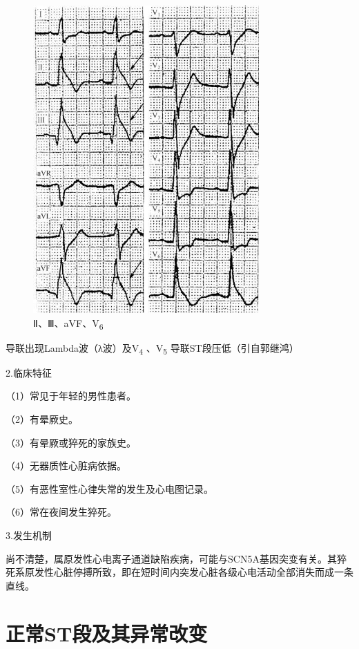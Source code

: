 \begin{figure}[!htbp]
 \centering
 \includegraphics[width=3.40625in,height=4.63542in]{./images/Image00081.jpg}
 \captionsetup{justification=centering}
 \caption{Ⅱ、Ⅲ、aVF、V\textsubscript{6}}
 \label{fig4-6}
  \end{figure} 
导联出现Lambda波（λ波）及V\textsubscript{4} 、V\textsubscript{5}
导联ST段压低（引自郭继鸿）

2.临床特征

（1）常见于年轻的男性患者。

（2）有晕厥史。

（3）有晕厥或猝死的家族史。

（4）无器质性心脏病依据。

（5）有恶性室性心律失常的发生及心电图记录。

（6）常在夜间发生猝死。

3.发生机制

尚不清楚，属原发性心电离子通道缺陷疾病，可能与SCN5A基因突变有关。其猝死系原发性心脏停搏所致，即在短时间内突发心脏各级心电活动全部消失而成一条直线。

\protect\hypertarget{text00011.html}{}{}

\protect\hypertarget{text00011.htmlux5cux23chapter11}{}{}

\chapter{正常ST段及其异常改变}

